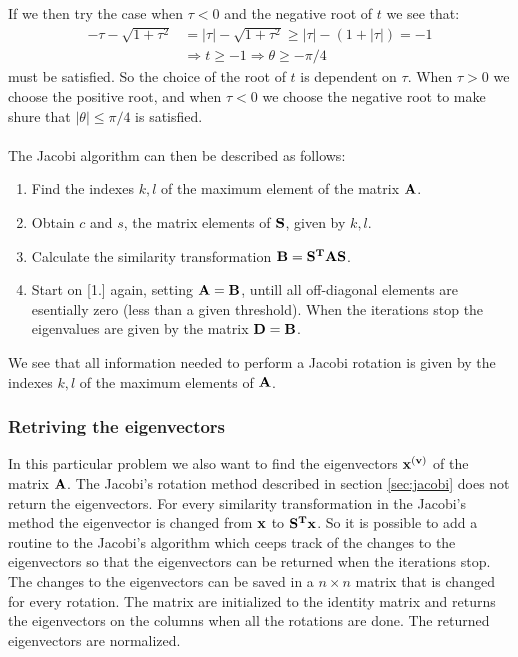 \documentclass[11pt,a4wide]{article}
\begin{document}
If we then try the case when $\tau < 0$ and the negative root of $t$ we see that:
\begin{align*}
-\tau - \sqrt{1 + \tau^2} &= |\tau| - \sqrt{1 + \tau^2} \geq |\tau| - (1 + |\tau|) = -1 \\
&\Rightarrow t \geq -1 \Rightarrow \theta \geq -\pi/4
\end{align*}
must be satisfied. So the choice of the root of $t$ is dependent on $\tau$. When $\tau > 0$ we choose the positive root, and when $\tau< 0$ we choose the negative root to make shure that $|\theta| \leq \pi /4 $ is satisfied. \\~\\

The Jacobi algorithm can then be described as follows: 
\begin{enumerate}
\item Find the indexes $k, l$ of the maximum element of the matrix $\bf A$.
\item Obtain $c$ and $s$, the matrix elements of $\bf S$, given by $k, l$.
\item Calculate the similarity transformation $\bf{B = S^TAS}$.
\item Start on [1.] again, setting $\bf {A = B}$, untill all off-diagonal elements are esentially zero (less than a given threshold). When the iterations stop the eigenvalues are given by the matrix $\bf {D = B}$.
\end{enumerate}

We see that all information needed to perform a Jacobi rotation is given by the indexes $k, l$ of the maximum elements of $\bf A$.

\subsubsection*{Retriving the eigenvectors}
In this particular problem we also want to find the eigenvectors $\bf x^{(v)}$ of the matrix $\bf A$. The Jacobi's rotation method described in section \ref{sec:jacobi} does not return the eigenvectors. For every similarity transformation in the Jacobi's method the eigenvector is changed from $\bf x$ to $\bf{S^Tx}$. So it is possible to add a routine to the Jacobi's algorithm which ceeps track of the changes to the eigenvectors so that the eigenvectors can be returned when the iterations stop. The changes to the eigenvectors can be saved in a $n\times n$ matrix that is changed for every rotation. The matrix are initialized to the identity matrix and returns the eigenvectors on the columns when all the rotations are done. The returned eigenvectors are normalized. 
\end{document}
